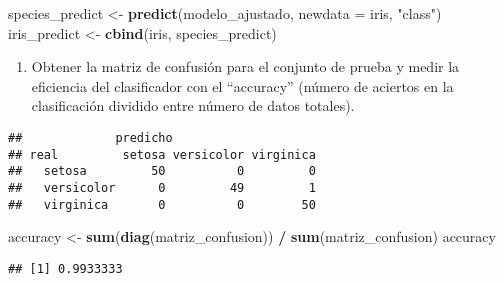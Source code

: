 \documentclass[
]{article}
\newenvironment{Shaded}{\begin{snugshade}}{\end{snugshade}}
\newcommand{\AttributeTok}[1]{\textcolor[rgb]{0.13,0.29,0.53}{#1}}
\newcommand{\FunctionTok}[1]{\textcolor[rgb]{0.13,0.29,0.53}{\textbf{#1}}}
\newcommand{\NormalTok}[1]{#1}
\newcommand{\OtherTok}[1]{\textcolor[rgb]{0.56,0.35,0.01}{#1}}
\newcommand{\SpecialCharTok}[1]{\textcolor[rgb]{0.81,0.36,0.00}{\textbf{#1}}}
\newcommand{\StringTok}[1]{\textcolor[rgb]{0.31,0.60,0.02}{#1}}
\providecommand{\tightlist}{%
  \setlength{\itemsep}{0pt}\setlength{\parskip}{0pt}}
\begin{document}
\begin{Shaded}
\begin{Highlighting}[]
\NormalTok{species\_predict }\OtherTok{\textless{}{-}} \FunctionTok{predict}\NormalTok{(modelo\_ajustado, }\AttributeTok{newdata =}\NormalTok{ iris, }\StringTok{"class"}\NormalTok{)}
\NormalTok{iris\_predict }\OtherTok{\textless{}{-}} \FunctionTok{cbind}\NormalTok{(iris, species\_predict)}
\end{Highlighting}
\end{Shaded}

\begin{enumerate}
\def\labelenumi{\arabic{enumi})}
\setcounter{enumi}{6}
\tightlist
\item
  Obtener la matriz de confusión para el conjunto de prueba y medir la
  eficiencia del clasificador con el ``accuracy'' (número de aciertos en
  la clasificación dividido entre número de datos totales).
\end{enumerate}

\begin{Shaded}
\end{Shaded}

\begin{verbatim}
##             predicho
## real         setosa versicolor virginica
##   setosa         50          0         0
##   versicolor      0         49         1
##   virginica       0          0        50
\end{verbatim}

\begin{Shaded}
\begin{Highlighting}[]
\NormalTok{accuracy }\OtherTok{\textless{}{-}} \FunctionTok{sum}\NormalTok{(}\FunctionTok{diag}\NormalTok{(matriz\_confusion)) }\SpecialCharTok{/} \FunctionTok{sum}\NormalTok{(matriz\_confusion)}
\NormalTok{accuracy}
\end{Highlighting}
\end{Shaded}

\begin{verbatim}
## [1] 0.9933333
\end{verbatim}
\end{document}
